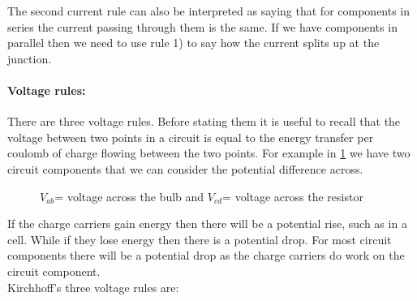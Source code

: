 The second current rule can also be interpreted as saying that for components in series the current passing through them is the same. If we have components in parallel then we need to use rule 1) to say how the current splits up at the junction.

\paragraph{Voltage rules:} There are three voltage rules. Before stating them it is useful to recall that the voltage between two points in a circuit is equal to the energy transfer per coulomb of charge flowing between the two points.  For example in \cref{fig: voltage rule 0} we have two circuit components that we can consider the potential difference across. 

\begin{figure}[ht]
    \centering
    \caption{$V_{ab}$= voltage across the bulb and $V_{cd}$= voltage across the resistor}
    \label{fig: voltage rule 0}
\end{figure}

If the charge carriers gain energy then there will be a potential rise, such as in a cell. While if they lose energy then there is a potential drop. For most circuit components there will be a potential drop as the charge carriers do work on the circuit component.\\

Kirchhoff's three voltage rules are:

